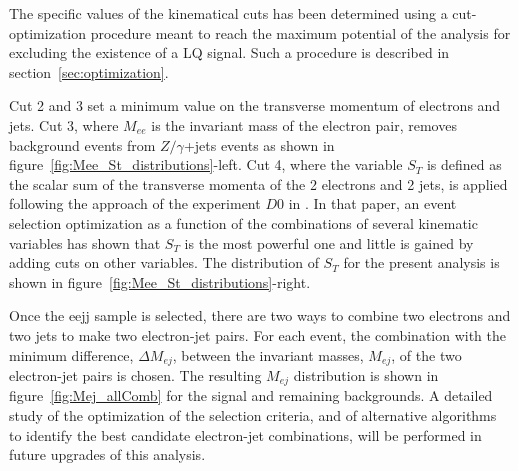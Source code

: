 The specific values of the kinematical cuts has been determined using a cut-optimization procedure meant to
reach the maximum potential of the analysis for excluding the existence of a LQ signal. 
Such a procedure is described in section~\ref{sec:optimization}.

Cut 2 and 3 set a minimum value on the transverse momentum of electrons and jets.
Cut 3, where $M_{ee}$ is the invariant mass of the electron pair, removes background events from 
$Z/\gamma$+jets events as shown in figure~\ref{fig:Mee_St_distributions}-left.
Cut 4, where the variable $S_T$ is defined as the scalar sum of the transverse momenta of the 
2 electrons and 2 jets, is applied following the approach of the experiment $D0$ in 
\cite{Abazov:2001mx}. In that paper, an event selection optimization as a function of
the combinations of several kinematic variables has shown that $S_T$ is the most powerful one 
and little is gained by adding cuts on other variables. The distribution of $S_T$ for the present
analysis is shown in figure~\ref{fig:Mee_St_distributions}-right.

Once the eejj sample is selected, there are two ways to combine two electrons and two jets to make two electron-jet pairs. 
For each event, the combination with the minimum difference, $\Delta M_{ej}$, between the invariant masses, $M_{ej}$, 
of the two electron-jet pairs is chosen. 
The resulting $M_{ej}$ distribution is shown in figure~\ref{fig:Mej_allComb} for the signal and remaining backgrounds. 
A detailed study of the optimization of the selection criteria, and of alternative algorithms to identify the best candidate 
electron-jet combinations, will be performed in future upgrades of this analysis.

